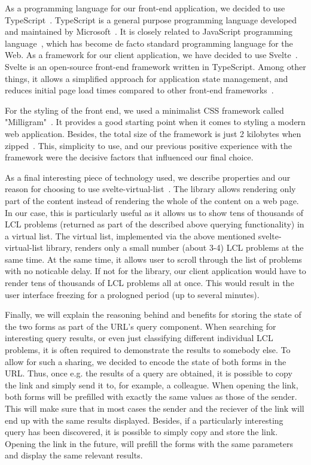 As a programming language for our front-end application, we decided
to use TypeScript~\cite{FiXMEs}. TypeScript is a general purpose
programming language developed and maintained by Microsoft~\cite{FIXME}. It is closely related to JavaScript programming language~\cite{FIXME}, which has become de facto standard programming language for the Web.
As a framework for our client application, we have decided to use
Svelte~\cite{FIXME}. Svelte is an open-source front-end framework
written in TypeScript. Among other things, it allows a simplified
approach for application state management, and reduces initial
page load times compared to other front-end frameworks~\cite{FIXME}.

For the styling of the front end, we used a minimalist CSS framework
called "Milligram"~\cite{FIXME}. It provides a good starting point
when it comes to styling a modern web application. Besides, the total
size of the framework is just 2 kilobytes when zipped~\cite{FIXME}.
This, simplicity to use, and our previous positive experience with
the framework were the decisive factors that influenced our final
choice.

As a final interesting piece of technology used, we describe properties
and our reason for choosing to use svelte-virtual-list~\cite{FIXME}.
The library allows rendering only part of the content instead of rendering
the whole of the content on a web page. In our case, this is
particularly useful as it allows us to
show tens of thousands of LCL problems (returned as part of the described above querying functionality) in a virtual list.
The virtual list, implemented via the above mentioned svelte-virtual-list library, renders only a small number (about 3-4)
LCL problems at the same time. At the same time, it allows user to
scroll through the list of problems with no noticable delay.
If not for the library, our client application would have to render
tens of thousands of LCL problems all at once. This would result in
the user interface freezing for a prologned period (up to several minutes).

Finally, we will explain the reasoning behind and benefits for
storing the state of the two forms as part of the URL's query
component. When searching for interesting query results, or even
just classifying different individual LCL problems, it is often
required to demonstrate the results to somebody else. To allow for such
a sharing, we decided to encode the state of both forms in the URL.
Thus, once e.g. the results of a query are obtained, it is possible
to copy the link and simply send it to, for example, a colleague.
When opening the link, both forms will be prefilled with
exactly the same values as those of the sender. This will make sure
that in most cases the sender and the reciever of the link will end
up with the same results displayed. Besides, if a particularly
interesting query has been discovered, it is possible to
simply copy and store the link. Opening the link in the future,
will prefill the forms with the same parameters and display
the same relevant results.


